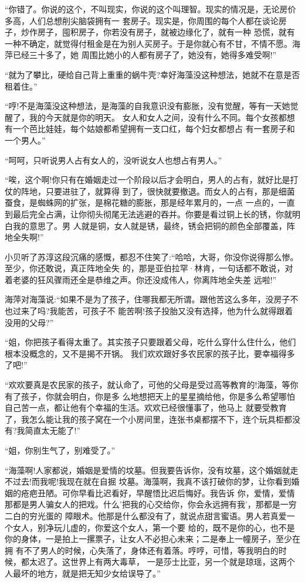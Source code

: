 \documentclass[11pt,a4paper,onecolumn]{article}
\begin{document}
``你错了。你说的这个，不叫现实，你说的这个叫理智。现实的情况是，无论房价多高，人们总想削尖脑袋拥有一
套房子。现实是，你周围的每个人都在谈论房子，炒作房子，囤积房子，你若没有房子，就被边缘化了，就有一种
恐慌，就有一种不确定，就觉得付租金是在为别人买房子。于是你就心有不甘，不情不愿。海萍已经三十多了，她
周围比她小的人都有房子了，她没有，她得多难受啊!''

``就为了攀比，硬给自己背上重重的蜗牛壳?幸好海藻没这种想法，她就不在意是否租着住。''

``哼!不是海藻没这种想法，是海藻的自我意识没有膨胀，没有觉醒，等有一天她觉醒了，我的今天就是你的明天。
女人和女人之间，没有什么不同。每个女孩都想有一个芭比娃娃，每个姑娘都希望拥有一支口红，每个妇女都想占
有一套房子和一个男人。''

``呵呵，只听说男人占有女人的，没听说女人也想占有男人。''

``唉，这个啊!你只有在婚姻走过一个阶段以后才会明白，男人的占有，就好比是打仗的阵地，只要进驻了，就算得
到了，很快就要撤退。而女人的占有，那是细菌蚕食，是蜘蛛网的扩张，是棉花糖的膨胀，那是经年累月的，一点
一点的，一直到最后完全占满，让你彻头彻尾无法逃避的吞并。你要是看过铜上长的锈，你就明白我的意思了。男
人就是铜，女人就是锈，最终，锈会把铜的颜色全部覆盖，阵地全失啊!''

小贝听了苏淳这段沉痛的感慨，都忍不住笑了:``哈哈，大哥，你没你说得那么惨。至少，你还敢说，真正阵地全失
的，那是亚伯拉罕·林肯，一句话都不敢说，对着老婆的狂风骤雨还全是恭维之声。你还没成伟人，你离阵地全失差
远啦!''

海萍对海藻说:``如果不是为了孩子，住哪我都无所谓。跟他苦这么多年，没房子不也过来了吗?我能苦，可孩子不
能苦啊!孩子投胎又没有选择，他为什么就得跟着没用的父母?''

``姐，你把孩子看得太重了。其实孩子只要跟着父母，吃什么穿什么住什么，他们根本没概念的，又不是揭不开锅。
我们欢欢跟好多农民家的孩子比，要幸福得多了吧!''

``欢欢要真是农民家的孩子，就认命了，可他的父母是受过高等教育的!海藻，等你有了孩子，你就会明白，你是多
么地想把天上的星星摘给他，你是多么希望哪怕自己苦一点，都让他有个幸福的生活。欢欢已经很懂事了，他马上
就要受教育了，我怎么能让我的孩子窝在一个小房间里，连张书桌都摆不下，连个玩具柜都没有?我简直太无能了!''

``姐，你别生气了，别难受了。''

``海藻啊!人家都说，婚姻是爱情的坟墓。但我要告诉你，没有坟墓，这个婚姻就走不过去!而我呢!我现在就在自掘
坟墓。海藻啊，我真不该打破你的梦，让你看到婚姻的疮疤丑陋。可你早看比迟看好，早醒悟比迟后悔好。我告诉
你，爱情，爱情那都是男人骗女人的把戏。什么'把我的心交给你，你会永远拥有我'，那都是一穷二白的穷光蛋的
障眼术。他那是什么都没有了，就说点甜言蜜语。男人若真爱一个女人，别净玩儿虚的，你爱这个女人，第一个要
给的，既不是你的心，也不是你的身体，一是拍上一摞票子，让女人不必担心未来；二是奉上一幢房子，至少在拥
有不了男人的时候，心失落了，身体还有着落。哼哼，可惜，等我明白的时候，都太迟了。这世界上有两大毒草，
一是莎士比亚，另一个就是琼瑶，这两个人最坏的地方，就是把无知少女给误导了。''
\end{document}
